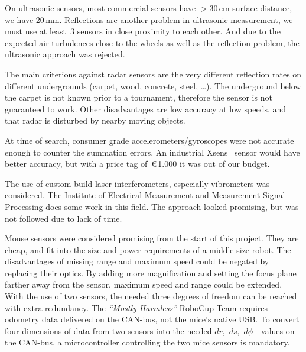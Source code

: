 \documentclass[12pt,a4paper]{article}
\newcommand{\MH}{\emph{``Mostly Harmless''} RoboCup Team\xspace}
\begin{document}
On ultrasonic sensors, most commercial sensors have $> $30\,cm surface distance, we have 20\,mm.
Reflections are another problem in ultrasonic measurement, we must use at least~3 sensors in close proximity to each other.
And due to the expected air turbulences close to the wheels as well as the reflection problem, the ultrasonic approach was rejected.

The main criterions against radar sensors are the very different reflection rates on different undergrounds (carpet, wood, concrete, steel, \dots).
The underground below the carpet is not known prior to a tournament, therefore the sensor is not guaranteed to work.
Other disadvantages are low accuracy at low speeds, and that radar is disturbed by nearby moving objects.

At time of search, consumer grade accelerometers/gyroscopes were not accurate enough to counter the summation errors.
An industrial Xsens~\cite{xsens} sensor would have better accuracy, but with a price tag of~\euro\,1.000 it was out of our budget.


The use of custom-build laser interferometers, especially vibrometers was considered.
The Institute of Electrical Measurement and Measurement Signal Processing does some work in this field.
The approach looked promising, but was not followed due to lack of time.

Mouse sensors were considered promising from the start of this project.
They are cheap, and fit into the size and power requirements of a middle size robot.
The disadvantages of missing range and maximum speed could be negated by replacing their optics.
By adding more magnification and setting the focus plane farther away from the sensor, maximum speed and range could be extended.\\
With the use of two sensors, the needed three degrees of freedom can be reached with extra redundancy. 
The \MH requires odometry data delivered on the CAN-bus, not the mice's native USB.
To convert four dimensions of data from two sensors into the needed $dr$,~$ds$,~$d\phi$ - values on the CAN-bus, a microcontroller controlling the two mice sensors is mandatory.\\
\end{document}
